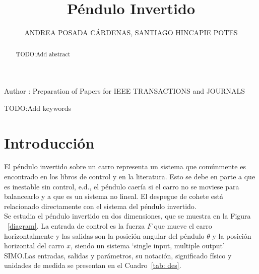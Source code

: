 \documentclass{ieeeaccess}
\begin{document}

\title{Péndulo Invertido}
\author{\uppercase{Andrea Posada Cárdenas},
  \uppercase{Santiago Hincapie Potes}}
\address[1]{Estudiante de Ingeniería Matemática, Universidad EAFIT,
  Medellin, Colombia (e-mail: aposad31@eafit.edu.co)}
\address[2]{Estudiante de Ingeniería Matemática, Universidad EAFIT,
  Medellin, Colombia (e-mail: shinca12@eafit.edu.co)}

\markboth{}
{Author \headeretal: Preparation of Papers for IEEE TRANSACTIONS and JOURNALS}


\begin{abstract}
  TODO:Add abstract
\end{abstract}

\begin{keywords}
  TODO:Add keywords
\end{keywords}

\titlepgskip=-15pt

\maketitle

\section{Introducción}\label{sec:introduction}

El péndulo invertido sobre un carro representa un sistema que comúnmente es
encontrado en los libros de control y en la literatura. Esto se debe en parte
a que es inestable sin control, e.d., el péndulo caería si el carro no se
moviese para balancearlo y a que es un sistema no lineal. El despegue de
cohete está relacionado directamente con el sistema del péndulo invertido.\\

Se estudia el péndulo invertido en dos dimensiones, que se muestra en la Figura
~\ref{diagram}. La entrada de control es la fuerza $F$ que mueve el carro
horizontalmente y las salidas son la posición angular del péndulo $\theta$ y la
posición horizontal del carro $x$, siendo un sistema `single input, multiple
output' SIMO.\@ Las entradas, salidas y parámetros, su notación, significado
físico y unidades de medida se presentan en el Cuadro~\ref{tab: des}.
\end{document}
